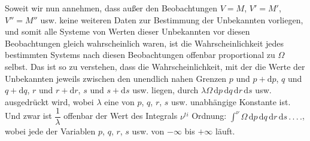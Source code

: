 Soweit wir nun annehmen, dass außer den Beobachtungen $V=M$, $V'=M'$, $V''=M''$ usw. keine weiteren Daten zur Bestimmung der Unbekannten vorliegen, und somit alle Systeme von Werten dieser Unbekannten vor diesen Beobachtungen gleich wahrscheinlich waren, ist die Wahrscheinlichkeit jedes bestimmten Systems nach diesen Beobachtungen offenbar proportional zu $\Omega$ selbst. Das ist so zu verstehen, dass die Wahrscheinlichkeit, mit der die Werte der Unbekannten jeweils zwischen den unendlich nahen Grenzen $p$ und $p+\mathrm{d}p$, $q$ und $q+\mathrm{d}q$, $r$ und $r+\mathrm{d}r$, $s$ und $s+\mathrm{d}s$ usw. liegen, durch $\lambda\Omega\,\mathrm{d}p\,\mathrm{d}q\,\mathrm{d}r\,\mathrm{d}s$ usw. ausgedrückt wird, wobei $\lambda$ eine von $p$, $q$, $r$, $s$ usw. unabhängige Konstante ist. Und zwar ist $\dfrac{1}{\lambda}$ offenbar der Wert des Integrals $\nu^{ti}$ Ordnung: $\int^{\nu}\Omega\,\mathrm{d}p\,\mathrm{d}q\,\mathrm{d}r\,\mathrm{d}s\, .\, .\, .\, .$, wobei jede der Variablen $p$, $q$, $r$, $s$ usw. von $-\infty$ bis $+\infty$ läuft.
